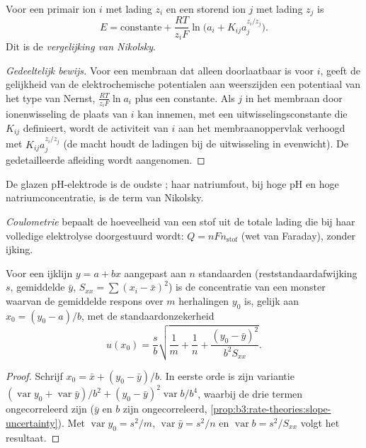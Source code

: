 \begin{proposition}\label{prop:b3:electrode-kinetics:nikolsky}
Voor een primair ion $i$ met lading $z_i$ en een storend ion $j$ met
lading $z_j$ is
\[
  E = \text{constante} + \frac{RT}{z_iF}\ln\bigl(a_i + K_{ij}a_j^{z_i/z_j}\bigr) .
\]
Dit is de \emph{vergelijking van Nikolsky}.
\end{proposition}

\begin{proof}[Gedeeltelijk bewijs]
Voor een membraan dat alleen doorlaatbaar is voor $i$, geeft de gelijkheid
van de elektrochemische potentialen aan weerszijden een potentiaal van
het type van Nernst, $\frac{RT}{z_iF}\ln a_i$ plus een constante.
Als $j$ in het membraan door ionenwisseling de plaats van $i$ kan innemen,
met een uitwisselingsconstante die $K_{ij}$ definieert, wordt de
activiteit van $i$ aan het membraanoppervlak verhoogd met
$K_{ij}a_j^{z_i/z_j}$ (de macht houdt de ladingen bij de uitwisseling in
evenwicht). De gedetailleerde afleiding wordt aangenomen.
\end{proof}

De glazen pH-elektrode is de oudste ; haar
natriumfout, bij hoge pH en hoge natriumconcentratie, is de term van
Nikolsky.

\begin{definition}[Coulometrie]\label{def:b3:electrode-kinetics:coulometry}
\emph{Coulometrie} bepaalt de hoeveelheid van een stof
uit de totale lading die bij haar volledige elektrolyse doorgestuurd wordt: $Q = nFn_{\text{stof}}$ (wet van
Faraday), zonder ijking.
\end{definition}

\begin{proposition}\label{prop:b3:electrode-kinetics:inverse-prediction}
Voor een ijklijn $y = a + bx$ aangepast aan $n$ standaarden
(reststandaardafwijking $s$, gemiddelde $\bar y$, $S_{xx} = \sum(x_i - \bar x)^2$) is de concentratie van een
monster waarvan de gemiddelde respons over $m$ herhalingen $y_0$ is, gelijk
aan $x_0 = (y_0 - a)/b$, met de standaardonzekerheid
\[
  u(x_0) = \frac{s}{b}\sqrt{\frac1m + \frac1n + \frac{(y_0 - \bar y)^2}{b^2S_{xx}}} .
\]
\end{proposition}

\begin{proof}
Schrijf $x_0 = \bar x + (y_0 - \bar y)/b$. In eerste orde is zijn variantie $(\operatorname{var}y_0 +
\operatorname{var}\bar y)/b^2 + (y_0 - \bar y)^2\operatorname{var}b/b^4$, waarbij de drie termen ongecorreleerd zijn ($\bar y$ en $b$
zijn ongecorreleerd, \cref{prop:b3:rate-theories:slope-uncertainty}). Met $\operatorname{var}y_0 =
s^2/m$, $\operatorname{var}\bar y = s^2/n$ en $\operatorname{var}b = s^2/S_{xx}$ volgt het resultaat.
\end{proof}


